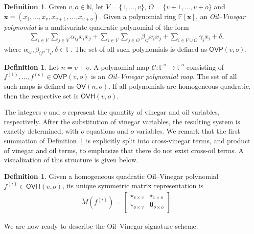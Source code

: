 \documentclass[12pt, a4paper, oneside]{memoir}
\theoremstyle{definition}
\newtheorem{definition}[theorem]{Definition}
\begin{document}
\begin{definition}\label{def:oil-vinegar-poly}
  Given $v, o \in \mathbb{N}$, let $V = \{1, \dots, v\}$, $O = \{v + 1, \dots, v + o\}$ and $\mathbf{x} = (x_{1}, \dots, x_{v}, x_{v + 1}, \dots, x_{v + o})$. Given a polynomial ring $\mathbb{F}[\mathbf{x}]$, an \emph{Oil--Vinegar polynomial} is a multivariate quadratic polynomial of the form
  \begin{align}
    \sum_{i \in V} \sum_{j \in V} \alpha_{ij} x_{i} x_{j}
      + \sum_{i \in V} \sum_{j \in O} \beta_{ij} x_{i} x_{j}
      + \sum_{i \in V \cup O} \gamma_{i} x_{i}
      + \delta,
  \end{align}
  where $\alpha_{ij}, \beta_{ij}, \gamma_{i}, \delta \in \mathbb{F}$. The set of all such polynomials is defined as $\mathsf{OVP}(v, o)$.
\end{definition}

\begin{definition}
  Let $n = v + o$. A polynomial map $\mathcal{C} : \mathbb{F}^{n} \to \mathbb{F}^{o}$ consisting of $f^{(1)}, \dots, f^{(o)} \in \mathsf{OVP}(v, o)$ is an \emph{Oil--Vinegar polynomial map}. The set of all such maps is defined as $\mathsf{OV}(n, o)$. If all polynomials are homogeneous quadratic, then the respective set is $\mathsf{OVH}(v, o)$.
\end{definition}

The integers $v$ and $o$ represent the quantity of vinegar and oil variables, respectively. After the substitution of vinegar variables, the resulting system is exactly determined, with $o$ equations and $o$ variables. We remark that the first summation of Definition~\ref{def:oil-vinegar-poly} is explicitly split into cross-vinegar terms, and product of vinegar and oil terms, to emphasize that there do not exist cross-oil terms. A visualization of this structure is given below.

\begin{definition}\label{def:ovh-matrix}
  Given a homogeneous quadratic Oil--Vinegar polynomial $f^{(i)} \in \mathsf{OVH}(v, o)$, its unique symmetric matrix representation is
  \begin{align}
    \widetilde{M}(f^{(i)}) =
    \begin{bmatrix}
      \star_{v \times v} & \star_{v \times o} \\
      \star_{o \times v} & \mathbf{0}_{o \times o} \\
    \end{bmatrix}.
  \end{align}
\end{definition}
We are now ready to describe the Oil--Vinegar signature scheme.
\end{document}
